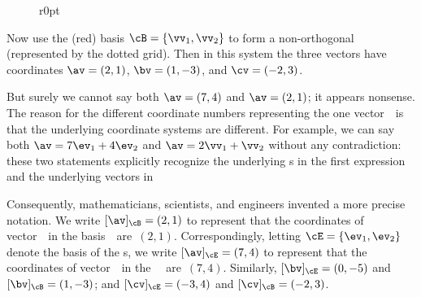 \begin{example}
\begin{wrapfigure}r{0pt}
\end{wrapfigure}
Now use the (red) basis \(\cB=\{\vv_1,\vv_2\}\) to form a non-orthogonal  (represented by the dotted grid).
Then in this system the three vectors have coordinates \(\av=(2,1)\), \(\bv=(1,-3)\), and \(\cv=(-2,3)\).


But surely we cannot say both \(\av=(7,4)\) and \(\av=(2,1)\); it appears nonsense.
The reason for the different coordinate numbers representing the one vector~\av\ is that the underlying coordinate systems are different.
For example, we can say both \(\av=7\ev_1+4\ev_2\) 
and \(\av=2\vv_1+\vv_2\) without any contradiction: these 
two statements explicitly recognize the underlying s in the first expression and the underlying  vectors in 

Consequently, mathematicians, scientists, and engineers invented a more precise notation.
We write \([\av]_\cB=(2,1)\) to represent that the coordinates of vector~\av\ in the basis~\cB\ are~\((2,1)\).
Correspondingly, letting \(\cE=\{\ev_1,\ev_2\}\) denote the basis of the s, we write \([\av]_\cE=(7,4)\) to represent that the coordinates of vector~\av\ in the ~\cE\ are~\((7,4)\).
Similarly, \([\bv]_\cE=(0,-5)\) and \([\bv]_\cB=(1,-3)\);
and \([\cv]_\cE=(-3,4)\) and \([\cv]_\cB=(-2,3)\).


\end{example}
